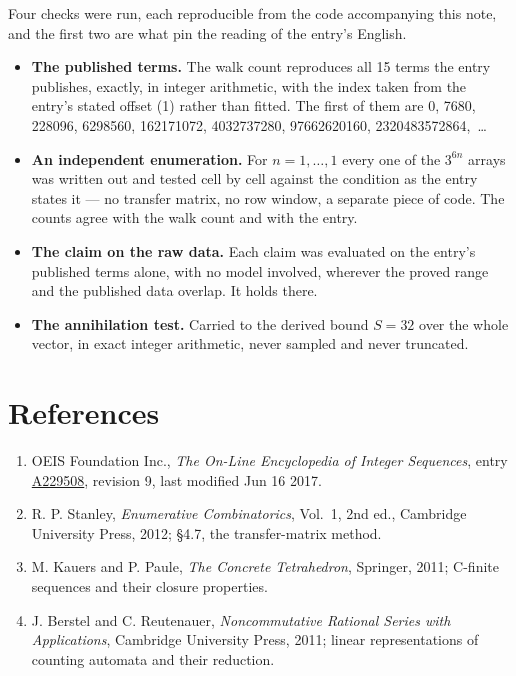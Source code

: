 \documentclass[11pt]{article}
\theoremstyle{definition}
\begin{document}
Four checks were run, each reproducible from the code accompanying this note, and the first two are what pin the reading of the entry's English.

\begin{itemize}

\item {\bfseries The published terms.} The walk count reproduces all 15 terms the entry publishes, exactly, in integer arithmetic, with the index taken from the entry's stated offset (1) rather than fitted. The first of them are 0, 7680, 228096, 6298560, 162171072, 4032737280, 97662620160, 2320483572864,~\dots

\item {\bfseries An independent enumeration.} For $n = 1,\dots,1$ every one of the $3^{6n}$ arrays was written out and tested cell by cell against the condition as the entry states it --- no transfer matrix, no row window, a separate piece of code. The counts agree with the walk count and with the entry.

\item {\bfseries The claim on the raw data.} Each claim was evaluated on the entry's published terms alone, with no model involved, wherever the proved range and the published data overlap. It holds there.

\item {\bfseries The annihilation test.} Carried to the derived bound $S = 32$ over the whole vector, in exact integer arithmetic, never sampled and never truncated.

\end{itemize}

\section{References}

\begin{enumerate}

\item OEIS Foundation Inc., \emph{The On-Line Encyclopedia of Integer Sequences}, entry \href{https://oeis.org/A229508}{A229508}, revision 9, last modified Jun 16 2017.

\item R. P. Stanley, \emph{Enumerative Combinatorics}, Vol.~1, 2nd ed., Cambridge University Press, 2012; \S4.7, the transfer-matrix method.

\item M. Kauers and P. Paule, \emph{The Concrete Tetrahedron}, Springer, 2011; C-finite sequences and their closure properties.

\item J. Berstel and C. Reutenauer, \emph{Noncommutative Rational Series with Applications}, Cambridge University Press, 2011; linear representations of counting automata and their reduction.

\end{enumerate}
\end{document}
